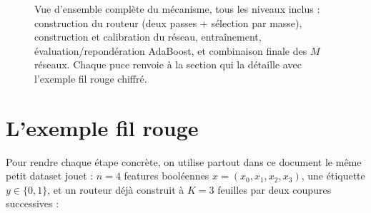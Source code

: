 \documentclass[12pt,a4paper]{article}
\theoremstyle{remark}
\begin{document}
\begin{figure}[h]
\caption{Vue d'ensemble complète du mécanisme, tous les niveaux inclus :
construction du routeur (deux passes + sélection par masse), construction et
calibration du réseau, entraînement, évaluation/repondération AdaBoost, et
combinaison finale des $M$ réseaux. Chaque puce renvoie à la section qui la
détaille avec l'exemple fil rouge chiffré.}
\label{fig:master-overview}
\end{figure}

\clearpage
\tableofcontents

\newpage

\section{L'exemple fil rouge}

Pour rendre chaque étape concrète, on utilise partout dans ce document le même
petit dataset jouet : $n=4$ features booléennes $x=(x_0,x_1,x_2,x_3)$, une
étiquette $y\in\{0,1\}$, et un routeur déjà construit à $K=3$ feuilles par deux
coupures successives :
\end{document}
